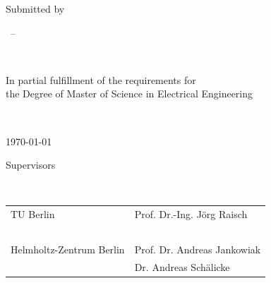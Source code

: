 \begin{titlingpage}
	\vfill
	
	\centering	
	Submitted by
	

	\theauthor  ~-- \theauthorinfo

	~
	
	In partial fulfillment of the requirements for \\ the Degree of Master of Science in Electrical Engineering

	~
	
	
	\today		
	
	\vfill		


	Supervisors
	
	~
	
	\setlength{\tabcolsep}{15pt}
	\begin{tabular}{l l}
		TU Berlin
		&Prof. Dr.-Ing. Jörg Raisch \\
	    ~ & ~\\
			Helmholtz-Zentrum Berlin 
		& Prof. Dr. Andreas Jankowiak \\
		~ & Dr. Andreas Schälicke
	\end{tabular}
\end{titlingpage}